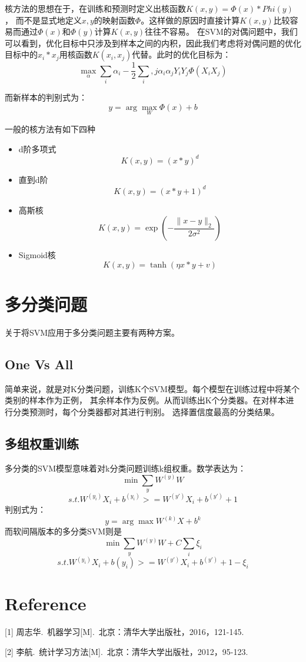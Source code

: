 \documentclass{article}
\begin{document}
核方法的思想在于，在训练和预测时定义出核函数$K(x,y)=\Phi(x)*Phi(y)$，
而不是显式地定义$x,y$的映射函数$\Phi$。这样做的原因时直接计算$K(x,y)$比较容易而通过$\Phi(x)$和$\Phi(y)$计算$K(x,y)$往往不容易。
在SVM的对偶问题中，我们可以看到，优化目标中只涉及到样本之间的内积，因此我们考虑将对偶问题的优化目标中的$x_i*x_j$用核函数$K(x_i,x_j)$代替。此时的优化目标为：
$$\max\limits_\alpha \sum_i\alpha_i-\frac 1 2 \sum_i,j \alpha_i\alpha_jY_iY_j\Phi(X_iX_j)$$

而新样本的判别式为：
$$y=\arg\max\limits_W\Phi(x)+b$$

一般的核方法有如下四种
\begin{itemize}
\item d阶多项式
$$K(x,y) = {(x*y)}^d$$
\item 直到d阶
$$K(x,y) = {(x*y+1)}^d$$
\item 高斯核
$$K(x,y) = \exp{(-\frac {\|x-y\|_2} {2\sigma^2})}$$
\item Sigmoid核
$$K(x,y) = \tanh(\eta x*y+v)$$

\end{itemize}

\section{多分类问题}
关于将SVM应用于多分类问题主要有两种方案。
\subsection{One Vs All}
简单来说，就是对K分类问题，训练K个SVM模型。每个模型在训练过程中将某个类别的样本作为正例，
其余样本作为反例。从而训练出K个分类器。在对样本进行分类预测时，每个分类器都对其进行判别。
选择置信度最高的分类结果。
\subsection{多组权重训练}
多分类的SVM模型意味着对k分类问题训练k组权重。数学表达为：
$$\min \sum\limits_y W^{(y)}W$$
$$s.t.W^{(y_i)}X_i+b^{(y_i)}>=W^{(y')}X_i+b^{(y')}+1$$
判别式为：
$$y=\arg\max W^{(k)}X+b^k$$
而软间隔版本的多分类SVM则是
$$\min \sum\limits_y W^{(y)}W+C\sum\limits_i\xi_i$$
$$s.t. W^{(y_i)}X_i+b{(y_i)}>= W^{(y')}X_i+b^{(y')}+1-\xi_i$$
\section{Reference}
\small

[1] 周志华.\ 机器学习[M].\ 北京：清华大学出版社，2016，121-145.


[2] 李航.\ 统计学习方法[M].\ 北京：清华大学出版社，2012，95-123.
\end{document}
